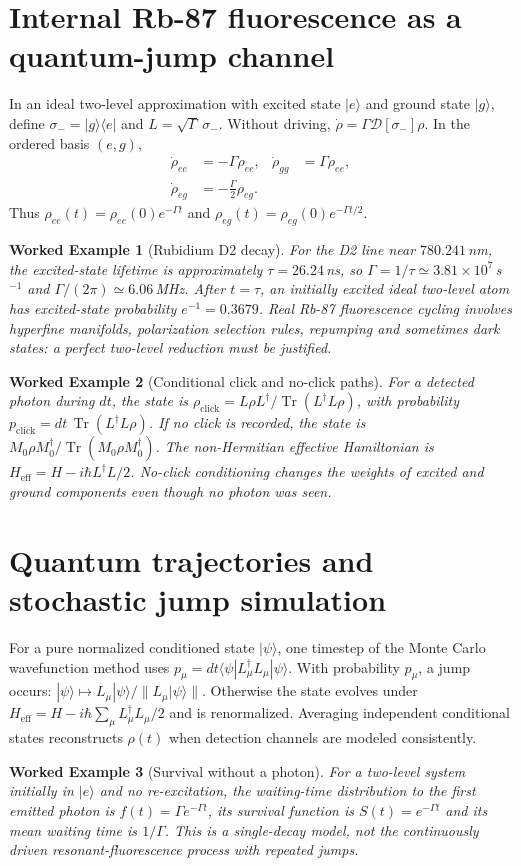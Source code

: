 \documentclass[11pt,a4paper]{article}
\newtheorem{example}{Worked Example}\newtheorem{remark}{Physical qualification}
\newcommand{\tr}{\operatorname{Tr}}\newcommand{\D}{\mathcal D}\newcommand{\kb}{k_{\mathrm B}}\newcommand{\E}{\mathbb E}\newcommand{\Ha}{\mathcal H}\newcommand{\ket}[1]{|#1\rangle}\newcommand{\bra}[1]{\langle#1|}
\begin{document}
\section{Internal Rb-87 fluorescence as a quantum-jump channel}
In an ideal two-level approximation with excited state $\ket e$ and ground state $\ket g$, define $\sigma_-=\ket g\bra e$ and $L=\sqrt\Gamma\,\sigma_-$. Without driving, $\dot\rho=\Gamma\D[\sigma_-]\rho$. In the ordered basis $(e,g)$,
\begin{align}
\dot\rho_{ee}&=-\Gamma\rho_{ee}, & \dot\rho_{gg}&=\Gamma\rho_{ee},\\
\dot\rho_{eg}&=-\frac\Gamma2\rho_{eg}.&&
\end{align}
Thus $\rho_{ee}(t)=\rho_{ee}(0)e^{-\Gamma t}$ and $\rho_{eg}(t)=\rho_{eg}(0)e^{-\Gamma t/2}$.
\begin{example}[Rubidium D2 decay]
For the D2 line near $780.241\,$nm, the excited-state lifetime is approximately $\tau=26.24\,$ns, so $\Gamma=1/\tau\simeq3.81\times10^7\,$s$^{-1}$ and $\Gamma/(2\pi)\simeq6.06\,$MHz. After $t=\tau$, an initially excited ideal two-level atom has excited-state probability $e^{-1}=0.3679$. Real Rb-87 fluorescence cycling involves hyperfine manifolds, polarization selection rules, repumping and sometimes dark states: a perfect two-level reduction must be justified.
\end{example}
\begin{example}[Conditional click and no-click paths]
For a detected photon during $dt$, the state is $\rho_\mathrm{click}=L\rho L^\dagger/\tr(L^\dagger L\rho)$, with probability $p_\mathrm{click}=dt\,\tr(L^\dagger L\rho)$. If no click is recorded, the state is $M_0\rho M_0^\dagger/\tr(M_0\rho M_0^\dagger)$. The non-Hermitian effective Hamiltonian is $H_\mathrm{eff}=H-i\hbar L^\dagger L/2$. No-click conditioning changes the weights of excited and ground components even though no photon was seen.
\end{example}
\section{Quantum trajectories and stochastic jump simulation}
For a pure normalized conditioned state $\ket\psi$, one timestep of the Monte Carlo wavefunction method uses $p_\mu=dt\bra\psi L_\mu^\dagger L_\mu\ket\psi$. With probability $p_\mu$, a jump occurs: $\ket\psi\mapsto L_\mu\ket\psi/\|L_\mu\ket\psi\|$. Otherwise the state evolves under $H_\mathrm{eff}=H-i\hbar\sum_\mu L_\mu^\dagger L_\mu/2$ and is renormalized. Averaging independent conditional states reconstructs $\rho(t)$ when detection channels are modeled consistently.
\begin{example}[Survival without a photon]
For a two-level system initially in $\ket e$ and no re-excitation, the waiting-time distribution to the first emitted photon is $f(t)=\Gamma e^{-\Gamma t}$, its survival function is $S(t)=e^{-\Gamma t}$ and its mean waiting time is $1/\Gamma$. This is a single-decay model, not the continuously driven resonant-fluorescence process with repeated jumps.
\end{example}
\end{document}
